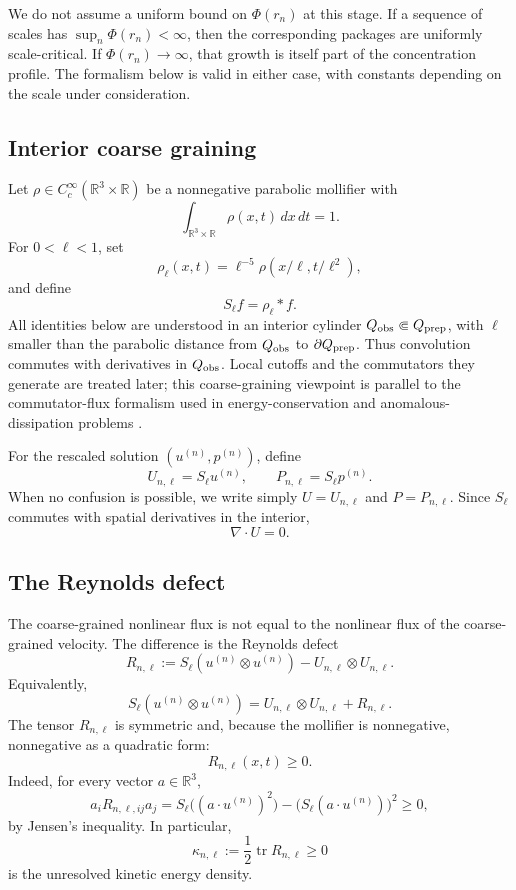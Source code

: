\documentclass[11pt]{article}
\numberwithin{equation}{section}
\theoremstyle{plain}
\theoremstyle{definition}
\theoremstyle{remark}
\newcommand{\R}{\mathbb R}
\newcommand{\tr}{\operatorname{tr}}
\begin{document}
We do not assume a uniform bound on \(\Phi(r_n)\) at this stage.  If a sequence of scales has \(\sup_n\Phi(r_n)<\infty\), then the corresponding packages are uniformly scale-critical.  If \(\Phi(r_n)\to\infty\), that growth is itself part of the concentration profile.  The formalism below is valid in either case, with constants depending on the scale under consideration.

\subsection{Interior coarse graining}

Let \(\rho\in C_c^\infty(\R^3\times\R)\) be a nonnegative parabolic mollifier with
\[
  \int_{\R^3\times\R}\rho(x,t)\,dx\,dt=1.
\]
For \(0<\ell<1\), set
\[
  \rho_\ell(x,t)=\ell^{-5}\rho(x/\ell,t/\ell^2),
\]
and define
\[
  S_\ell f=\rho_\ell*f.
\]
All identities below are understood in an interior cylinder \(Q_{\rm obs}\Subset Q_{\rm prep}\), with \(\ell\) smaller than the parabolic distance from \(Q_{\rm obs}\) to \(\partial Q_{\rm prep}\).  Thus convolution commutes with derivatives in \(Q_{\rm obs}\).  Local cutoffs and the commutators they generate are treated later; this coarse-graining viewpoint is parallel to the commutator-flux formalism used in energy-conservation and anomalous-dissipation problems \cite{ConstantinETiti1994,Eyink1994,DuchonRobert2000}.

For the rescaled solution \((u^{(n)},p^{(n)})\), define
\[
  U_{n,\ell}=S_\ell u^{(n)},
  \qquad
  P_{n,\ell}=S_\ell p^{(n)}.
\]
When no confusion is possible, we write simply \(U=U_{n,\ell}\) and \(P=P_{n,\ell}\).  Since \(S_\ell\) commutes with spatial derivatives in the interior,
\[
  \nabla\cdot U=0.
\]

\subsection{The Reynolds defect}

The coarse-grained nonlinear flux is not equal to the nonlinear flux of the coarse-grained velocity.  The difference is the Reynolds defect
\begin{equation}
  R_{n,\ell}
  :=
  S_\ell(u^{(n)}\otimes u^{(n)})
  -U_{n,\ell}\otimes U_{n,\ell}.
  \label{eq:Reynolds-defect}
\end{equation}
Equivalently,
\[
  S_\ell(u^{(n)}\otimes u^{(n)})
  =U_{n,\ell}\otimes U_{n,\ell}+R_{n,\ell}.
\]
The tensor \(R_{n,\ell}\) is symmetric and, because the mollifier is nonnegative, nonnegative as a quadratic form:
\[
  R_{n,\ell}(x,t)\ge0.
\]
Indeed, for every vector \(a\in\R^3\),
\[
  a_iR_{n,\ell,ij}a_j
  =S_\ell\bigl((a\cdot u^{(n)})^2\bigr)
  -\bigl(S_\ell(a\cdot u^{(n)})\bigr)^2
  \ge0,
\]
by Jensen's inequality.  In particular,
\[
  \kappa_{n,\ell}:=\frac12\tr R_{n,\ell}\ge0
\]
is the unresolved kinetic energy density.
\end{document}
